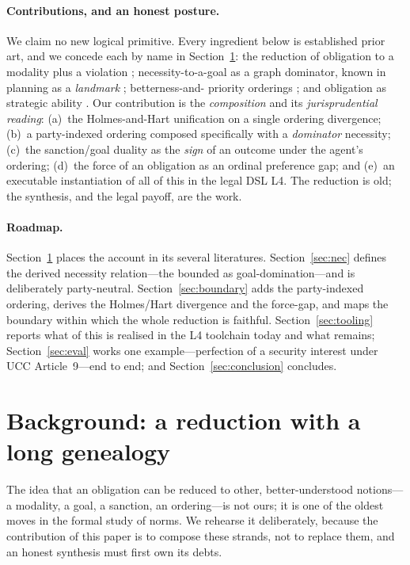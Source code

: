 \paragraph{Contributions, and an honest posture.} We claim no new logical primitive. Every
ingredient below is established prior art, and we concede each by name in
Section~\ref{sec:background}: the reduction of obligation to a modality plus a violation
; necessity-to-a-goal as a graph dominator, known in
planning as a \emph{landmark} ; betterness-and-
priority orderings ; and obligation as strategic
ability . Our contribution is the \emph{composition}
and its \emph{jurisprudential reading}: (a)~the Holmes-and-Hart unification on a single
ordering divergence; (b)~a party-indexed ordering composed specifically with a
\emph{dominator} necessity; (c)~the sanction/goal duality as the \emph{sign} of an outcome
under the agent's ordering; (d)~the force of an obligation as an ordinal preference gap;
and (e)~an executable instantiation of all of this in the legal DSL L4. The reduction is
old; the synthesis, and the legal payoff, are the work.

\paragraph{Roadmap.} Section~\ref{sec:background} places the account in its several
literatures. Section~\ref{sec:nec} defines the derived necessity relation---the bounded
\MUST{} as goal-domination---and is deliberately party-neutral. Section~\ref{sec:boundary}
adds the party-indexed ordering, derives the Holmes/Hart divergence and the force-gap, and
maps the boundary within which the whole reduction is faithful.
Section~\ref{sec:tooling} reports what of this is realised in the L4 toolchain today and
what remains; Section~\ref{sec:eval} works one example---perfection of a security interest
under UCC Article~9---end to end; and Section~\ref{sec:conclusion} concludes.

\section{Background: a reduction with a long genealogy}
\label{sec:background}

The idea that an obligation can be reduced to other, better-understood notions---a
modality, a goal, a sanction, an ordering---is not ours; it is one of the oldest moves in
the formal study of norms. We rehearse it deliberately, because the contribution of this
paper is to compose these strands, not to replace them, and an honest synthesis must first
own its debts.


